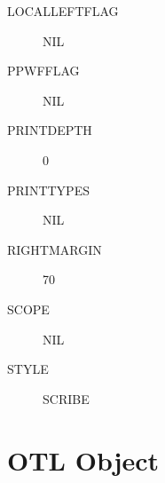 \begin{description}
\begin{description}
\item[LOCALLEFTFLAG] NIL

\item[PPWFFLAG] NIL

\item[PRINTDEPTH] 0

\item[PRINTTYPES] NIL

\item[RIGHTMARGIN] 70

\item[SCOPE] NIL

\item[STYLE] SCRIBE

\end{description}

\item
\end{description}

\section{OTL Object}

